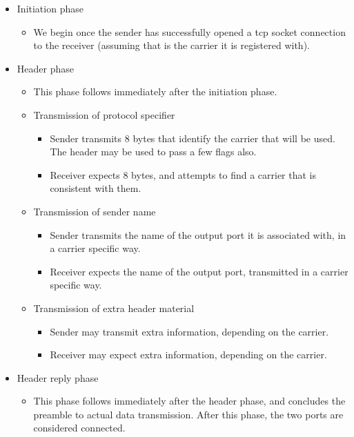 \documentclass[a4]{article}
\begin{document}
\begin{itemize}

\item Initiation phase
  \begin{itemize}
  \item We begin once the sender has
    successfully opened a tcp socket connection to the receiver
    (assuming that is the carrier it is registered with).
  \end{itemize}

\item Header phase
  \begin{itemize}
  \item This phase follows immediately after the initiation phase.
  \item Transmission of protocol specifier
    \begin{itemize}
      \item Sender transmits 8 bytes that identify the carrier
	that will be used.  The header may be used to pass a 
	few flags also.
      \item Receiver expects 8 bytes, and attempts to find a
	carrier that is consistent with them.
    \end{itemize}
  \item Transmission of sender name
    \begin{itemize}
      \item Sender transmits the name of the output port
	it is associated with, in a carrier specific way.
      \item Receiver expects the name of the output port,
	transmitted in a carrier specific way.
    \end{itemize}
  \item Transmission of extra header material
    \begin{itemize}
      \item Sender may transmit extra information, depending on
      the carrier.
      \item Receiver may expect extra information, depending on
      the carrier.
    \end{itemize}
  \end{itemize}

\item Header reply phase

  \begin{itemize}
    
  \item This phase follows immediately after the header phase, and
    concludes the preamble to actual data transmission.  After this
    phase, the two ports are considered connected.
    

\end{itemize}
\end{itemize}
\end{document}
